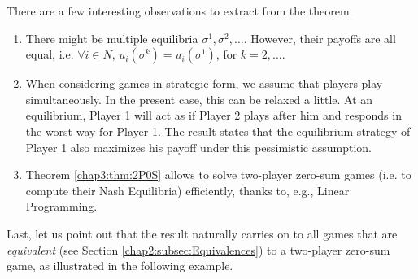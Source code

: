 There are a few interesting observations to extract from the theorem.
\begin{enumerate}
\item There might be multiple equilibria $\sigma^1, \sigma^2, \ldots$. However, their payoffs are all equal, i.e. $\forall i \in N$, $u_i(\sigma^k) = u_i(\sigma^1)$, for $k = 2, \ldots$.
\item When considering games in strategic form, we assume that players play simultaneously. In the present case, this can be relaxed a little. At an equilibrium, Player 1 will act as if Player 2 plays after him and responds in the worst way for Player 1. The result states that the equilibrium strategy of Player 1 also maximizes his payoff under this pessimistic assumption.
\item Theorem \ref{chap3:thm:2P0S} allows to solve two-player zero-sum games (i.e. to compute their Nash Equilibria) efficiently, thanks to, e.g., Linear Programming.
\end{enumerate}
\label{chap:NE}

Last, let us point out that the result naturally
carries on to all games that are \emph{equivalent} (see Section \ref{chap2:subsec:Equivalences}) to a two-player zero-sum game, as illustrated in the following example.


